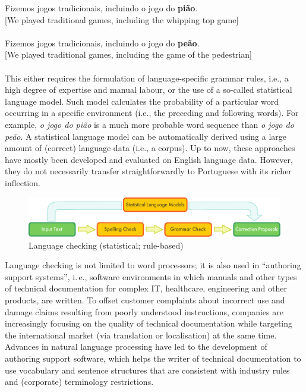 \documentclass[]{../metanetpaper}
\begin{document}
\begin{multicols}{2}
Fizemos jogos tradicionais, incluindo o jogo do \textbf{pião}.\\
{[}We played traditional games, including the whipping top game{]}\\
\\
Fizemos jogos tradicionais, incluindo o jogo do \textbf{peão}.\\
{[}We played traditional games, including the game of the pedestrian{]}\\
\\
This either requires the formulation of language-specific grammar rules, i.e., a high degree of expertise and manual labour, or the use of a so-called statistical language model. Such model calculates the probability of a particular word occurring in a specific environment (i.e., the preceding and following words). For example, \textit{o jogo do pião} is a much more probable word sequence than \textit{o jogo do peão}. A statistical language model can be automatically derived using a large amount of (correct) language data (i.e., a corpus). Up to now, these approaches have mostly been developed and evaluated on English language data. However, they do not necessarily transfer straightforwardly to Portuguese with its richer inflection. 

\begin{figure}[htb]
  \center
  \includegraphics[width=\textwidth]{../_media/english/language_checking}
  \caption{Language checking (statistical; rule-based)}
  \label{fig:langcheckingaarch_en}
\end{figure}



Language checking is not limited to word processors; it is also used in “authoring support systems”, i.\,e., software environments in which manuals and other types of technical documentation for complex IT, healthcare, engineering and other products, are written. To offset customer complaints about incorrect use and damage claims resulting from poorly understood instructions, companies are increasingly focusing on the quality of technical documentation while targeting the international market (via translation or localisation) at the same time. Advances in natural language processing have led to the development of authoring support software, which helps the writer of technical documentation to use vocabulary and sentence structures that are consistent with industry rules and (corporate) terminology restrictions.


\end{multicols}
\end{document}
